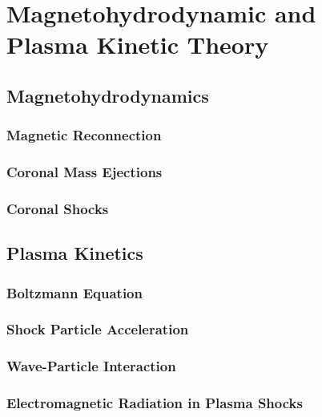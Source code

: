 

\chapter{Magnetohydrodynamic and \\ Plasma Kinetic Theory} 
\label{chap:2}


\section{Magnetohydrodynamics}\label{sec:1}

\subsection{Magnetic Reconnection}\label{sec:10}

\subsection{Coronal Mass Ejections}\label{sec:11}

\subsection{Coronal Shocks}\label{sec:12}




\section{Plasma Kinetics}\label{sec:2}

\subsection{Boltzmann Equation}\label{sec:20}

\subsection{Shock Particle Acceleration}\label{sec:21}

\subsection{Wave-Particle Interaction}\label{sec:22}

\subsection{Electromagnetic Radiation in Plasma Shocks}\label{sec:23}